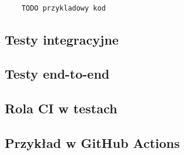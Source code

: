 \begin{lstlisting}[caption={Test jednostkowy w języku Python}]
    
    TODO przykladowy kod
\end{lstlisting}
\subsection{Testy integracyjne}

\subsection{Testy end-to-end}

\subsection{Rola CI w testach}

\subsection{Przykład w GitHub Actions}